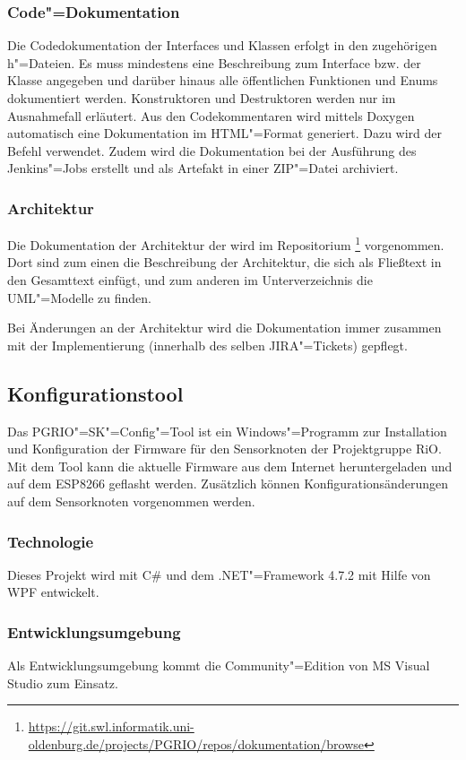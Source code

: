\subsubsection{Code"=Dokumentation}
Die Codedokumentation der Interfaces und Klassen erfolgt in den zugehörigen h"=Dateien.
Es muss mindestens eine Beschreibung zum Interface bzw. der Klasse angegeben und darüber hinaus alle öffentlichen Funktionen und Enums dokumentiert werden.
Konstruktoren und Destruktoren werden nur im Ausnahmefall erläutert.
Aus den Codekommentaren wird mittels Doxygen automatisch eine Dokumentation im HTML"=Format generiert.
Dazu wird der Befehl  verwendet.
Zudem wird die Dokumentation bei der Ausführung des Jenkins"=Jobs erstellt und als Artefakt in einer ZIP"=Datei archiviert.

\subsubsection{Architektur}
\label{sec:skArchitektur}
Die Dokumentation der Architektur der \skfw wird im Repositorium \footnote{\url{https://git.swl.informatik.uni-oldenburg.de/projects/PGRIO/repos/dokumentation/browse}} vorgenommen.
Dort sind zum einen die Beschreibung der Architektur, die sich als Fließtext in den Gesamttext einfügt, und zum anderen im Unterverzeichnis  die UML"=Modelle zu finden.

Bei Änderungen an der Architektur wird die Dokumentation immer zusammen mit der Implementierung (innerhalb des selben JIRA"=Tickets) gepflegt.

\subsection{Konfigurationstool}
Das PGRIO"=SK"=Config"=Tool ist ein Windows"=Programm zur Installation und Konfiguration der Firmware für den Sensorknoten der Projektgruppe RiO.
Mit dem Tool kann die aktuelle Firmware aus dem Internet heruntergeladen und auf dem ESP8266 geflasht werden.
Zusätzlich können Konfigurationsänderungen auf dem Sensorknoten vorgenommen werden.

\subsubsection{Technologie}
Dieses Projekt wird mit C\# und dem .NET"=Framework 4.7.2 mit Hilfe von WPF entwickelt.

\subsubsection{Entwicklungsumgebung}
Als Entwicklungsumgebung kommt die Community"=Edition von MS Visual Studio zum Einsatz.

